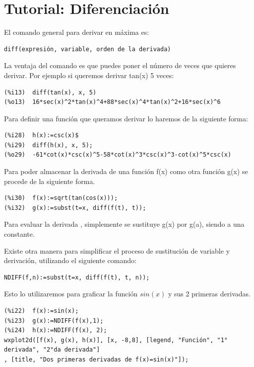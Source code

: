 \documentclass[a4paper]{article}
\begin{document}
\section{Tutorial: Diferenciación}

El comando general para derivar en máxima es:

\begin{verbatim}
diff(expresión, variable, orden de la derivada)
\end{verbatim}

La ventaja del comando es que puedes poner el número de veces que quieres derivar. Por ejemplo si queremos derivar tan(x) 5 veces:

\begin{verbatim}
(%i13)	diff(tan(x), x, 5)
(%o13)	16*sec(x)^2*tan(x)^4+88*sec(x)^4*tan(x)^2+16*sec(x)^6
\end{verbatim}

Para definir una función que queramos derivar lo haremos de la siguiente forma:

\begin{verbatim}
(%i28)	h(x):=csc(x)$
(%i29)	diff(h(x), x, 5);
(%o29)	-61*cot(x)*csc(x)^5-58*cot(x)^3*csc(x)^3-cot(x)^5*csc(x)
\end{verbatim}


Para poder almacenar la derivada de una función f(x) como otra función g(x) se procede de la siguiente forma.

\begin{verbatim}
(%i30)	f(x):=sqrt(tan(cos(x)));
(%i32)	g(x):=subst(t=x, diff(f(t), t));
\end{verbatim}

Para evaluar la derivada , simplemente se sustituye g(x) por g(a), siendo a una constante. 

Existe otra manera para simplificar el proceso de sustitución de variable y derivación, utilizando el siguiente comando:

\begin{verbatim}
NDIFF(f,n):=subst(t=x, diff(f(t), t, n));
\end{verbatim}

Esto lo utilizaremos para graficar la función $sin(x)$ y sus 2 primeras derivadas.

\begin{verbatim}
(%i22)	f(x):=sin(x);
(%i23)	g(x):=NDIFF(f(x),1);
(%i24)	h(x):=NDIFF(f(x), 2);
wxplot2d([f(x), g(x), h(x)], [x, -8,8], [legend, "Función", "1° derivada", "2°da derivada"]
, [title, "Dos primeras derivadas de f(x)=sin(x)"]);
\end{verbatim}
\end{document}
